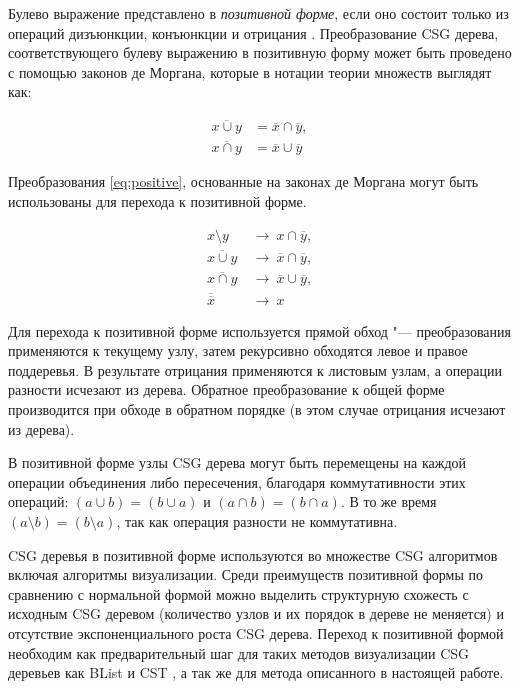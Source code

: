 Булево выражение представлено в \textit{позитивной форме}, если оно состоит только из операций дизъюнкции, конъюнкции и отрицания . Преобразование CSG дерева, соответствующего булеву выражению в позитивную форму может быть проведено с помощью законов де Моргана, которые в нотации теории множеств выглядят как:

\begin{align}
  \overline{x \cup y} & = \overline{x} \cap \overline{y}, \nonumber \\
  \overline{x \cap y} & = \overline{x} \cup \overline{y} \nonumber
\end{align}

Преобразования \ref{eq:positive}, основанные на законах де Моргана могут быть использованы для перехода к позитивной форме.

\begin{equation}
  \label{eq:positive}
  \begin{alignedat}{2}
    x \setminus y \  & \rightarrow \  x \cap \overline{y}, \\
    \overline{x \cup y} \  & \rightarrow \  \overline{x} \cap \overline{y}, \\
    \overline{x\cap y} \  & \rightarrow \  \overline{x} \cup \overline{y}, \\
    \overline{\overline{x}} \  & \rightarrow \  x
  \end{alignedat}
\end{equation}

Для перехода к позитивной форме используется прямой обход "--- преобразования применяются к текущему узлу, затем рекурсивно обходятся левое и правое поддеревья. В результате отрицания применяются к листовым узлам, а операции разности исчезают из дерева. Обратное преобразование к общей форме производится при обходе в обратном порядке (в этом случае отрицания исчезают из дерева).

В позитивной форме узлы CSG дерева могут быть перемещены на каждой операции объединения либо пересечения, благодаря коммутативности этих операций: $(a \cup b) = (b \cup a)$ и $(a \cap b) = (b \cap a)$. В то же время $(a \setminus b) = (b \setminus a)$, так как операция разности не коммутативна.

CSG деревья в позитивной форме используются во множестве CSG алгоритмов  включая алгоритмы визуализации. Среди преимуществ позитивной формы по сравнению с нормальной формой можно выделить структурную схожесть с исходным CSG деревом (количество узлов и их порядок в дереве не меняется) и отсутствие экспоненциального роста CSG дерева. Переход к позитивной формой необходим как предварительный шаг для таких методов визуализации CSG деревьев как BList  и CST , а так же для метода описанного в настоящей работе.

